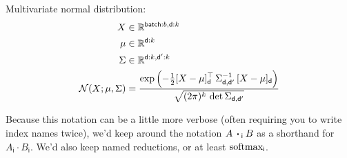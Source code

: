\documentclass{article}
\newcommand{\name}[1]{\mathsf{#1}}
\newcommand{\ndot}[1]{\mathbin{\mathop{\thinspace\boldsymbol\cdot\thinspace}\displaylimits_{\name{#1}}}}
\newcommand{\nfun}[2]{\mathop{\text{#2}}\displaylimits_{\name{#1}}}
\begin{document}
Multivariate normal distribution:
\begin{align*} 
X &\in \mathbb{R}^{\name{batch}:{b}, \name{d}:{k}}  \\
\mu &\in \mathbb{R}^{{\name{d}:{k}}}  \\
\Sigma & \in   \mathbb{R}^{{\name{d}:{k}, \name{d'}:{k}}}  \\
{\cal N}(X; \mu, \Sigma) &= \frac{\displaystyle \exp\left(-\tfrac{1}{2} [X - \mu]_{\name{d}}^\top \, \Sigma_{\name{d},\name{d'}}^{-1} \, [X - \mu]_{\name{d}} \right) }{\sqrt{(2 \pi)^k \, \mathop{\text{det}} \Sigma_{\name{d},\name{d'}}} }
\end{align*}

Because this notation can be a little more verbose (often requiring you to write index names twice), we'd keep around the notation $A \ndot{i} B$ as a shorthand for $A_{\name{i}} \cdot B_{\name{i}}$. We'd also keep named reductions, or at least $\nfun{i}{softmax}$.



\end{document}
